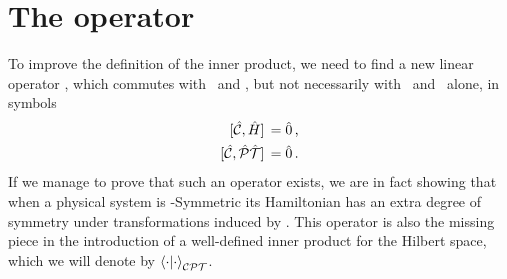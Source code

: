     \section{The \texorpdfstring{\hC}{C} operator}
        To improve the definition of the inner product, we need to find a new linear operator \hC, which commutes with \hH\ and \hPT, but not necessarily with \hP\ and \hT\ alone, in symbols
        \begin{align}
            \label{eq:C-H-commutator}
            \comm*{\hC}{\hH} &= \hzero
            \mycomma
            \\
            \label{eq:C-PT-commutator}
            \comm*{\hC}{\hPT} &= \hzero
            \myperiod
        \end{align}
        If we manage to prove that such an operator exists, we are in fact showing that when a physical system is \hPT-Symmetric its Hamiltonian has an extra degree of symmetry under transformations induced by \hC. This operator is also the missing piece in the introduction of a well-defined inner product for the Hilbert space, which we will denote by $\braket{\cdot}{\cdot}_{\mathcal{C}\mathcal{P}\mathcal{T}}$.

